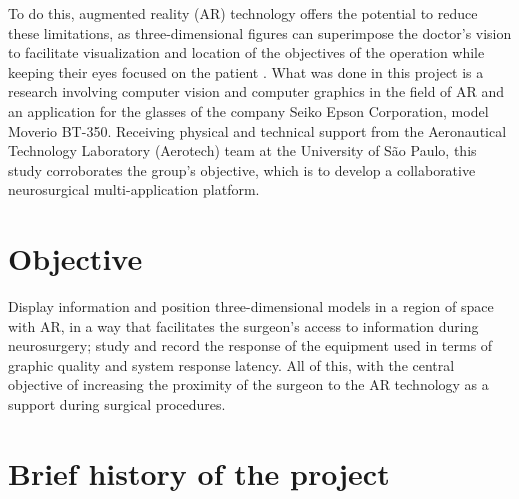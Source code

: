 To do this, augmented reality (AR) technology offers the potential to reduce these limitations, as three-dimensional figures can superimpose the doctor's vision to facilitate visualization and location of the objectives of the operation while keeping their eyes focused on the patient \cite{enhancedvision}. What was done in this project is a research involving computer vision and computer graphics in the field of AR and an application for the glasses of the company Seiko Epson Corporation\textregistered , model Moverio BT-350\texttrademark. Receiving physical and technical support from the Aeronautical Technology Laboratory (Aerotech) team at the University of São Paulo, this study corroborates the group's objective, which is to develop a collaborative neurosurgical multi-application platform.

\section{Objective}

Display information and position three-dimensional models in a region of space with AR, in a way that facilitates the surgeon's access to information during neurosurgery; study and record the response of the equipment used in terms of graphic quality and system response latency. All of this, with the central objective of increasing the proximity of the surgeon to the AR technology as a support during surgical procedures.



\section{Brief history of the project}


